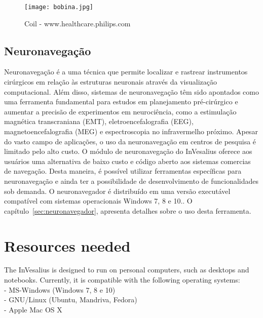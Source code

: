 \begin{figure}[!htb]
\centering
\texttt{[image: bobina.jpg]}
\caption{Coil - www.healthcare.philips.com}
\end{figure}

\subsection{Neuronavegação}
\label{sec:neuronavegador_intro}

Neuronavegação é a uma técnica que permite localizar e rastrear instrumentos cirúrgicos em relação às estruturas neuronais através da visualização computacional. Além disso, sistemas de neuronavegação têm sido apontados como uma ferramenta fundamental para estudos em planejamento pré-cirúrgico e aumentar a precisão de experimentos em neurociência, como a estimulação magnética transcraniana (EMT), eletroencefalografia (EEG), magnetoencefalografia (MEG) e espectroscopia no infravermelho próximo. Apesar do vasto campo de aplicações, o uso da neuronavegação em centros de pesquisa é limitado pelo alto custo. O módulo de neuronavegação do InVesalius oferece aos usuários uma alternativa de baixo custo e código aberto aos sistemas comercias de navegação. Desta maneira, é possível utilizar ferramentas específicas para neuronavegação e ainda ter a possibilidade de desenvolvimento de funcionalidades sob demanda. O neuronavegador é distribuído em uma versão executável compatível com sistemas operacionais Windows 7, 8 e 10.. O capítulo~\ref{sec:neuronavegador}, apresenta detalhes sobre o uso desta ferramenta.


\section{Resources needed}

The InVesalius is designed to run on personal computers, such as desktops and notebooks. Currently, it is compatible with the following operating systems:\\
- MS-Windows (Windows 7, 8 e 10)\\
- GNU/Linux (Ubuntu, Mandriva, Fedora)\\
- Apple Mac OS X

